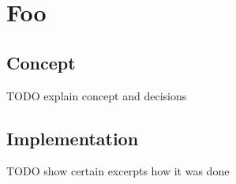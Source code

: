\chapter{Foo}\label{ch:foo}
\section{Concept}
TODO explain concept and decisions

\section{Implementation}
TODO show certain excerpts how it was done

